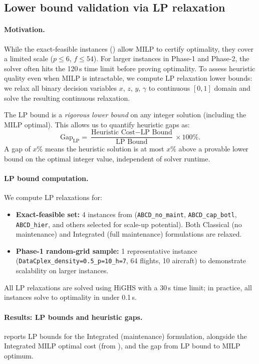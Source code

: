 \subsection{Lower bound validation via LP relaxation}
\label{subsec:lp_lower_bounds}

\paragraph{Motivation.}
While the exact-feasible instances () allow MILP
to certify optimality, they cover a limited scale ($p \le 6$, $f \le 54$). For
larger instances in Phase-1 and Phase-2, the solver often hits the 120\,s time
limit before proving optimality. To assess heuristic quality even when MILP is
intractable, we compute LP relaxation lower bounds: we relax all binary decision
variables $x$, $z$, $y$, $\gamma$ to continuous $[0,1]$ domain and solve the
resulting continuous relaxation.

The LP bound is a \emph{rigorous lower bound} on any integer solution (including
the MILP optimal). This allows us to quantify heuristic gaps as:
\[
  \text{Gap}_{\text{LP}} = \frac{\text{Heuristic Cost} - \text{LP Bound}}{\text{LP Bound}} \times 100\%.
\]
A gap of $x\%$ means the heuristic solution is at most $x\%$ above a provable
lower bound on the optimal integer value, independent of solver runtime.

\paragraph{LP bound computation.}
We compute LP relaxations for:
\begin{itemize}
  \item \textbf{Exact-feasible set:} 4 instances from 
    (\texttt{ABCD\_no\_maint}, \texttt{ABCD\_cap\_botl}, \texttt{ABCD\_hier},
    and others selected for scale-up potential). Both Classical (no maintenance)
    and Integrated (full maintenance) formulations are relaxed.
  \item \textbf{Phase-1 random-grid sample:} 1 representative instance
    (\texttt{DataCplex\_density=0.5\_p=10\_h=7}, 64 flights, 10 aircraft)
    to demonstrate scalability on larger instances.
\end{itemize}
All LP relaxations are solved using HiGHS with a 30\,s time limit; in practice,
all instances solve to optimality in under 0.1\,s.

\paragraph{Results: LP bounds and heuristic gaps.}
 reports LP bounds for the Integrated (maintenance)
formulation, alongside the Integrated MILP optimal cost (from
), and the gap from LP bound to MILP optimum.

